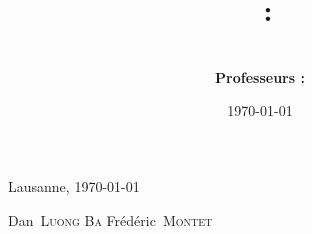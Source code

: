 \documentclass[a4paper, 11pt]{report}
\title{
  \textbf{\mCourse\ :} \mTitle
  \vspace{0.3cm} \\
  \mReportTitle
}
\author{
  \mAuthors
  \vspace{1cm} \\
  \textbf{Professeurs :} \mClassInstructor
}
\date{\today}
\newcommand{\mAuthorOneFN}{Dan}
\newcommand{\mAuthorOneLN}{Luong Ba}
\newcommand{\mAuthorTwoFN}{Frédéric}
\newcommand{\mAuthorTwoLN}{Montet}
\newcommand{\mLocation}{Lausanne} %
\begin{document}

\maketitle



\newpage
\tableofcontents
\newpage










\vspace{3cm}
\mLocation, \today
\vspace{1.5cm} \\

\begin{center}
  \mAuthorOneFN\ \textsc{\mAuthorOneLN}
  \hspace{5cm}
  \mAuthorTwoFN\ \textsc{\mAuthorTwoLN}
\end{center}




%
%



% 
\end{document}
